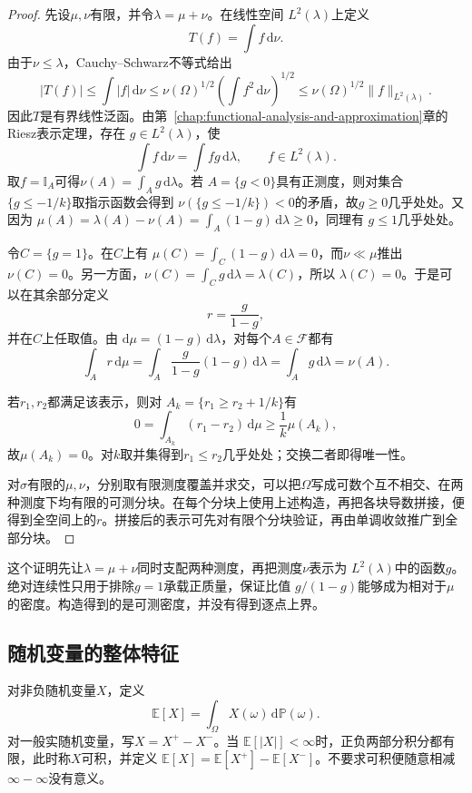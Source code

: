 \begin{proof}
先设\(\mu,\nu\)有限，并令\(\lambda=\mu+\nu\)。在线性空间
\(L^2(\lambda)\)上定义
\[
  T(f)=\int f\,\mathrm{d}\nu.
\]
由于\(\nu\leq\lambda\)，Cauchy--Schwarz不等式给出
\[
  |T(f)|
  \leq\int|f|\,\mathrm{d}\nu
  \leq\nu(\Omega)^{1/2}
       \left(\int f^2\,\mathrm{d}\nu\right)^{1/2}
  \leq\nu(\Omega)^{1/2}\lVert f\rVert_{L^2(\lambda)}.
\]
因此\(T\)是有界线性泛函。由第~\ref{chap:functional-analysis-and-approximation}章的Riesz表示定理，存在
\(g\in L^2(\lambda)\)，使
\[
  \int f\,\mathrm{d}\nu=\int fg\,\mathrm{d}\lambda,
  \qquad f\in L^2(\lambda).
\]
取\(f=\mathbb{I}_A\)可得\(\nu(A)=\int_Ag\,\mathrm{d}\lambda\)。若
\(A=\{g<0\}\)具有正测度，则对集合\(\{g\leq-1/k\}\)取指示函数会得到
\(\nu(\{g\leq-1/k\})<0\)的矛盾，故\(g\geq0\)几乎处处。又因为
\(\mu(A)=\lambda(A)-\nu(A)=\int_A(1-g)\,\mathrm{d}\lambda\geq0\)，同理有
\(g\leq1\)几乎处处。

令\(C=\{g=1\}\)。在\(C\)上有
\(\mu(C)=\int_C(1-g)\,\mathrm{d}\lambda=0\)，而\(\nu\ll\mu\)推出
\(\nu(C)=0\)。另一方面，\(\nu(C)=\int_Cg\,\mathrm{d}\lambda=\lambda(C)\)，所以
\(\lambda(C)=0\)。于是可以在其余部分定义
\[
  r=\frac{g}{1-g},
\]
并在\(C\)上任取值。由
\(\mathrm{d}\mu=(1-g)\,\mathrm{d}\lambda\)，对每个\(A\in\mathcal{F}\)都有
\[
  \int_A r\,\mathrm{d}\mu
  =\int_A\frac{g}{1-g}(1-g)\,\mathrm{d}\lambda
  =\int_Ag\,\mathrm{d}\lambda
  =\nu(A).
\]

若\(r_1,r_2\)都满足该表示，则对
\(A_k=\{r_1\geq r_2+1/k\}\)有
\[
  0=\int_{A_k}(r_1-r_2)\,\mathrm{d}\mu
  \geq\frac{1}{k}\mu(A_k),
\]
故\(\mu(A_k)=0\)。对\(k\)取并集得到\(r_1\leq r_2\)几乎处处；交换二者即得唯一性。

对\(\sigma\)有限的\(\mu,\nu\)，分别取有限测度覆盖并求交，可以把\(\Omega\)写成可数个互不相交、在两种测度下均有限的可测分块。在每个分块上使用上述构造，再把各块导数拼接，便得到全空间上的\(r\)。拼接后的表示可先对有限个分块验证，再由单调收敛推广到全部分块。
\end{proof}

这个证明先让\(\lambda=\mu+\nu\)同时支配两种测度，再把测度\(\nu\)表示为
\(L^2(\lambda)\)中的函数\(g\)。绝对连续性只用于排除\(g=1\)承载正质量，保证比值
\(g/(1-g)\)能够成为相对于\(\mu\)的密度。构造得到的是可测密度，并没有得到逐点上界。


\subsection{随机变量的整体特征}
\label{sec:rv-features}
\label{sec:probability-expectation-conditional-expectation}
\label{sec:probability-moment-transforms}
对非负随机变量\(X\)，定义
\[ \mathbb{E}[X]
  =\int_{\Omega}X(\omega)\,\mathrm{d}\mathbb{P}(\omega). \]
对一般实随机变量，写\(X=X^+-X^-\)。当
\(\mathbb{E}[|X|]<\infty\)时，正负两部分积分都有限，此时称\(X\)可积，并定义
\(\mathbb{E}[X]=\mathbb{E}[X^+]-\mathbb{E}[X^-]\)。不要求可积便随意相减\(\infty-\infty\)没有意义。

